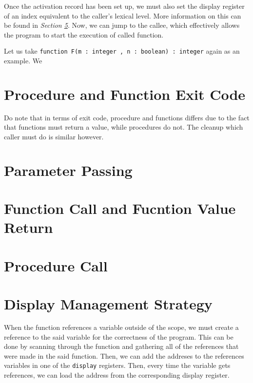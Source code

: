 \documentclass{article}
\begin{document}
Once the activation record has been set up, we must also set the display register of an index equivalent to the caller's lexical level. More information on this can be found in {\it Section \ref{display}}. Now, we can jump to the callee, which effectively allows the program to start the execution of called function.

Let us take {\tt function F(m : integer , n : boolean) : integer} again as an example. We 

\section{Procedure and Function Exit Code}

Do note that in terms of exit code, procedure and functions differs due to the fact that functions must return a value, while procedures do not. The cleanup which caller must do is similar however.

\section{Parameter Passing}

\section{Function Call and Fucntion Value Return}

\section{Procedure Call}

\section{Display Management Strategy} \label{display}

When the function references a variable outside of the scope, we must create a reference to the said variable for the correctness of the program. This can be done by scanning through the function and gathering all of the references that were made in the said function. Then, we can add the addreses to the references variables in one of the {\tt display} registers. Then, every time the variable gets references, we can load the address from the corresponding display register.

\end{document}
